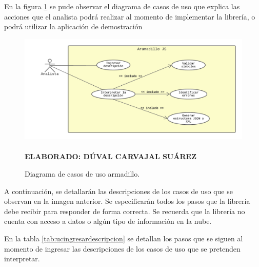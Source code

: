 En la figura \ref{fig:armadillocasodeuso} se pude observar el diagrama de casos de uso que explica las acciones que el analista podrá realizar al momento de implementar la librería, o podrá utilizar la aplicación de demostración


\begin{figure}[h!]
	\caption{Diagrama de casos de uso armadillo.}
	\includegraphics[width=15cm]{img/modelamientocasodeuso.png}
	\label{fig:armadillocasodeuso}
	\textbf{\\ \\ ELABORADO: DÚVAL CARVAJAL SUÁREZ}
\end{figure} 

A continuación, se detallarán las descripciones de los casos de uso que se observan en la imagen anterior. Se especificarán todos los pasos que la librería debe recibir para responder de forma correcta. Se recuerda que la librería no cuenta con acceso a datos o algún tipo de información en la nube.  

En la tabla \ref{tab:ucingresardescripcion} se detallan los pasos que se siguen al momento de ingresar las descripciones de los casos de uso que se pretenden interpretar.


\newpage

